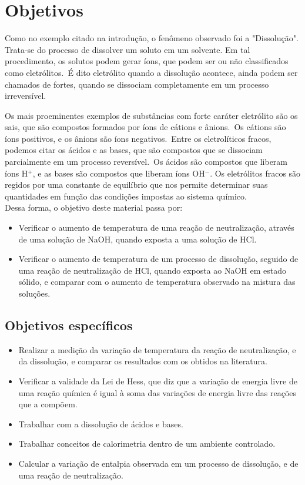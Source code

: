 \section{Objetivos}\label{sec:objetivos}

\indent Como no exemplo citado na introdução, o fenômeno observado foi a "Dissolução". Trata-se do processo de dissolver um soluto em um solvente. Em tal procedimento, os solutos podem gerar íons,
que podem ser ou não classificados como eletrólitos.\ É dito eletrólito quando a dissolução acontece, ainda podem ser chamados de fortes, quando se dissociam completamente em um processo
irreversível.

\indent Os mais proeminentes exemplos de substâncias com forte caráter eletrólito são os sais, que são compostos formados por íons de cátions e ânions.\ Os cátions são íons positivos, e os ânions são íons negativos.\
Entre os eletrolíticos fracos, podemos citar os ácidos e as bases, que são compostos que se dissociam parcialmente em um processo reversível.\ Os ácidos são compostos que liberam íons H$^+$,
e as bases são compostos que liberam íons OH$^-$. Os eletrólitos fracos são regidos por uma constante de equilíbrio que nos permite determinar suas quantidades em função das condições impostas ao sistema químico.\\

\indent Dessa forma, o objetivo deste material passa por:

\begin{itemize}
        \item Verificar o aumento de temperatura de uma reação de neutralização, através de uma solução de NaOH, quando exposta a uma solução de HCl.
        \item Verificar o aumento de temperatura de um processo de dissolução, seguido de uma reação de neutralização de HCl, quando exposta ao NaOH em estado sólido, e comparar com o aumento de temperatura observado na mistura das soluções.
    \end{itemize}
    \subsection{Objetivos específicos}\label{sec:objetivos_especificos}
    \begin{itemize}
        \item Realizar a medição da variação de temperatura da reação de neutralização, e da dissolução, e comparar os resultados com os obtidos na literatura.
        \item Verificar a validade da Lei de Hess, que diz que a variação de energia livre de uma reação química é igual à soma das variações de energia livre das reações que a compõem.
        \item Trabalhar com a dissolução de ácidos e bases.
        \item Trabalhar conceitos de calorimetria dentro de um ambiente controlado.
        \item Calcular a variação de entalpia observada em um processo de dissolução, e de uma reação de neutralização.
    \end{itemize}